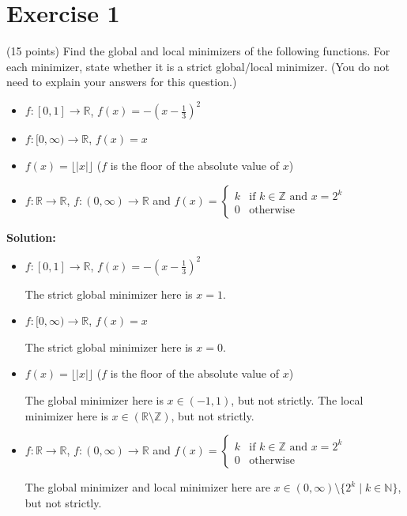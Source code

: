 \documentclass{article}
\begin{document}
\section*{Exercise 1}
(15 points) Find the global and local minimizers of the following functions. For each minimizer, state whether it is a strict global/local minimizer. (You do not need to explain your answers for this question.)

\begin{itemize}
    \item $f: [0,1] \to \mathbb{R}$, $f(x) = -(x-\frac{1}{3})^2$
    \item $f: [0,\infty) \to \mathbb{R}$, $f(x) = x$
    \item $f(x) = \lfloor|x|\rfloor$ ($f$ is the floor of the absolute value of $x$)
    \item $f: \mathbb{R} \to \mathbb{R}$, $f: (0,\infty) \to \mathbb{R}$ and $f(x) = \begin{cases} 
        k & \text{if } k \in \mathbb{Z} \text{ and } x = 2^k \\
        0 & \text{otherwise}
    \end{cases}$
\end{itemize}

\textbf{Solution:}

\begin{itemize}
    \item $f: [0,1] \to \mathbb{R}$, $f(x) = -(x-\frac{1}{3})^2$
    
    The strict global minimizer here is $x = 1$.
    \item $f: [0,\infty) \to \mathbb{R}$, $f(x) = x$
    
    The strict global minimizer here is $x = 0$.
    \item $f(x) = \lfloor|x|\rfloor$ ($f$ is the floor of the absolute value of $x$)
    
    The global minimizer here is $x \in (-1, 1)$, but not strictly. The local minimizer here is $x \in (\mathbb{R} \setminus \mathbb{Z})$, but not strictly.
    \item $f: \mathbb{R} \to \mathbb{R}$, $f: (0,\infty) \to \mathbb{R}$ and $f(x) = \begin{cases} 
        k & \text{if } k \in \mathbb{Z} \text{ and } x = 2^k \\
        0 & \text{otherwise}
    \end{cases}$

    The global minimizer and local minimizer here are $x \in (0, \infty) \setminus \{2^k \mid k \in \mathbb{N}\}$, but not strictly.
\end{itemize}
\end{document}

